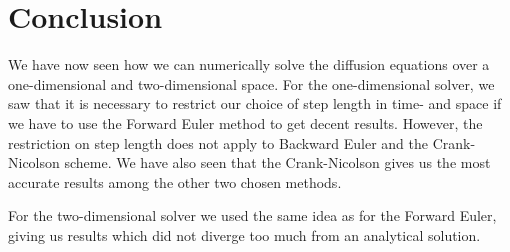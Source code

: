 \section{Conclusion}
We have now seen how we can numerically solve the diffusion equations over a one-dimensional and two-dimensional space. For the one-dimensional solver, we saw that it is necessary to restrict our choice of step length in time- and space if we have to use the Forward Euler method to get decent results.  However, the restriction on step length does not apply to Backward Euler and the Crank-Nicolson scheme. We have also seen that the Crank-Nicolson gives us the most accurate results among the other two chosen methods. 

For the two-dimensional solver we used the same idea as for the Forward Euler, giving us results which did not diverge too much from an analytical solution. 
